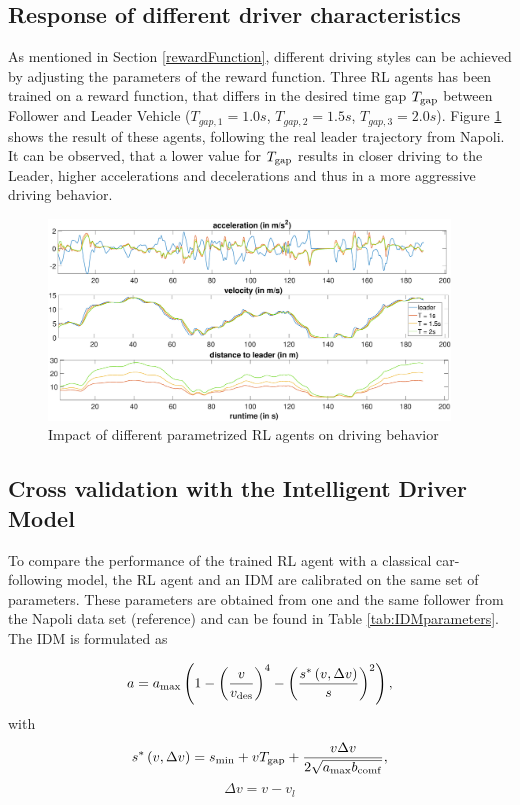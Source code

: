 \documentclass[review]{elsarticle}
\begin{document}
\subsection{Response of different driver characteristics}
\label{sec:differentT}

As mentioned in Section \ref{rewardFunction}, different driving styles can be achieved by adjusting the parameters of the reward function. Three RL agents has been trained on a reward function, that differs in the desired time gap $T_{\rm gap}$ between Follower and Leader Vehicle ($T_{gap,1} = 1.0s$, $T_{gap,2} = 1.5s$, $T_{gap,3} = 2.0s$). Figure \ref{fig:differentT} shows the result of these agents, following the real leader trajectory from Napoli. It can be observed, that a lower value for $T_{\rm gap}$ results in closer driving to the Leader, higher accelerations and decelerations and thus in a more aggressive driving behavior. 

\begin{figure}
	\centering
	\includegraphics[width=0.95\textwidth]{images/differentT}
	\caption{Impact of different parametrized RL agents on driving behavior}
	\label{fig:differentT}
\end{figure}


\subsection{Cross validation with the Intelligent Driver Model}
To compare the performance of the trained RL agent with a classical car-following model, the RL agent and an IDM are calibrated on the same set of parameters. These parameters are obtained from one and the same follower from the Napoli data set (reference) and can be found in Table \ref{tab:IDMparameters}. The IDM is formulated as 

\begin{equation}
a=a_{\rm max}\left(1-\left(\frac{v}{v_{\rm des}}\right)^{4}-\left(\frac{s^{*}\left(v, \Delta v\right)}{s}\right)^{2}\right),
\end{equation}
with
\begin{equation}
s^{*}\left(v, \Delta v\right)=s_{\rm min}+vT_{\rm gap}+\frac{v \Delta v}{2 \sqrt{a_{\rm max} b_{\rm comf}}},
\end{equation}
\begin{equation}
\Delta v = v-v_l
\end{equation}
\end{document}
